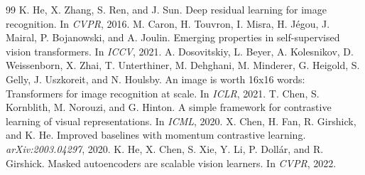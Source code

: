 \documentclass{article}
\begin{document}
{\small
\begin{thebibliography}{99}
\setlength{\itemsep}{0pt}
 K. He, X. Zhang, S. Ren, and J. Sun. Deep residual learning for image recognition. In \emph{CVPR}, 2016.
 M. Caron, H. Touvron, I. Misra, H. J\'egou, J. Mairal, P. Bojanowski, and A. Joulin. Emerging properties in self-supervised vision transformers. In \emph{ICCV}, 2021.
 A. Dosovitskiy, L. Beyer, A. Kolesnikov, D. Weissenborn, X. Zhai, T. Unterthiner, M. Dehghani, M. Minderer, G. Heigold, S. Gelly, J. Uszkoreit, and N. Houlsby. An image is worth 16x16 words: Transformers for image recognition at scale. In \emph{ICLR}, 2021.
 T. Chen, S. Kornblith, M. Norouzi, and G. Hinton. A simple framework for contrastive learning of visual representations. In \emph{ICML}, 2020.
 X. Chen, H. Fan, R. Girshick, and K. He. Improved baselines with momentum contrastive learning. \emph{arXiv:2003.04297}, 2020.
 K. He, X. Chen, S. Xie, Y. Li, P. Doll\'ar, and R. Girshick. Masked autoencoders are scalable vision learners. In \emph{CVPR}, 2022.
\end{thebibliography}
}
\end{document}
